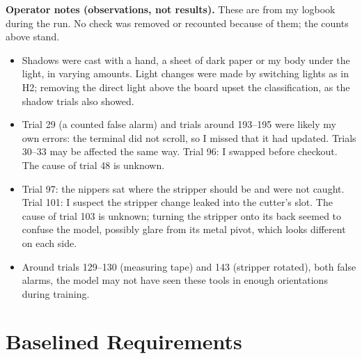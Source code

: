 \textbf{Operator notes (observations, not results).} These are from my
logbook during the run. No check was removed or recounted because of them;
the counts above stand.
\begin{itemize}
\item Shadows were cast with a hand, a sheet of dark paper or my body
under the light, in varying amounts. Light changes were made by switching
lights as in H2; removing the direct light above the board upset the
classification, as the shadow trials also showed.
\item Trial 29 (a counted false alarm) and trials around 193--195 were
likely my own errors: the terminal did not scroll, so I missed that it
had updated. Trials 30--33 may be affected the same way. Trial 96: I
swapped before checkout. The cause of trial 48 is unknown.
\item Trial 97: the nippers sat where the stripper should be and were not
caught. Trial 101: I suspect the stripper change leaked into the cutter's
slot. The cause of trial 103 is unknown; turning the stripper onto its
back seemed to confuse the model, possibly glare from its metal pivot,
which looks different on each side.
\item Around trials 129--130 (measuring tape) and 143 (stripper rotated),
both false alarms, the model may not have seen these tools in enough
orientations during training.
\end{itemize}

\section{Baselined Requirements}

